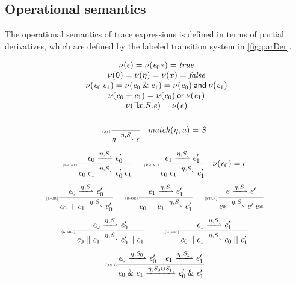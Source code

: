 \subsection{Operational semantics}
The operational semantics of trace expressions is defined in terms of partial derivatives, which are defined by the labeled transition system in \cref{fig:parDer}.
\begin{figure}[t]
 $$
  \begin{array}{c}
   \hasEps{\eps}=\hasEps{\starop{\re_0}}=\true                                                              \\                                                                                                      \hasEps{\none}=\hasEps{\ev}=\hasEps{\var}=\false \\
   \hasEps{\re_0\catop\re_1}=\hasEps{\re_0\andop\re_1}=\hasEps{\re_0}\conj\hasEps{\re_1}                    \\
   \hasEps{\re_0\orop\re_1}=\hasEps{\re_0}\disj\hasEps{\re_1}                                               \\ \hasEps{\existOp{\var}{\cts}{\re}}=\hasEps{\re} \\[4ex]
   \Rule{at}{}{\atom\parDer{\ev,\cts}\eps}{\match(\ev,\atom)=\cts}                                          \\[4ex]
   \Rule{l-cat}{\re_0\parDer{\ev,\cts}\re'_0}{\re_0\catop\re_1\parDer{\ev,\cts}\re'_0\catop\re_1}{}\quad
   \Rule{r-cat}{\re_1\parDer{\ev,\cts}\re'_1}{\re_0\catop\re_1\parDer{\ev,\cts}\re'_1}{\hasEps{\re_0}=\eps} \\[4ex]
   \Rule{l-or}{\re_0\parDer{\ev,\cts}\re'_0}{\re_0\orop\re_1\parDer{\ev,\cts}\re'_0}{} \quad
   \Rule{r-or}{\re_1\parDer{\ev,\cts}\re'_1}{\re_0\orop\re_1\parDer{\ev,\cts}\re'_1}{} \quad
   \Rule{star}{\re\parDer{\ev,\cts}\re'}{\starop{\re}\parDer{\ev,\cts}\re'\catop\starop{\re}}{}             \\[4ex]
   \Rule{l-shf}{\re_0\parDer{\ev,\cts}\re'_0}{\re_0\shuffleop\re_1\parDer{\ev,\cts}\re'_0\shuffleop\re_1}{} \qquad
   \Rule{r-shf}{\re_1\parDer{\ev,\cts}\re'_1}{\re_0\shuffleop\re_1\parDer{\ev,\cts}\re_0\shuffleop\re'_1}{} \\[4ex]
   \Rule{and}{\re_0\parDer{\ev,\cts_0}\re'_0\quad\re_1\parDer{\ev,\cts_1}\re'_1}{\re_0\andop\re_1\parDer{\ev,\ctsconj{\cts_0}{\cts_1}}\re'_0\andop\re'_1}{%
   }                                                                                                        \\[4ex]

\end{array}$$
\end{figure}
